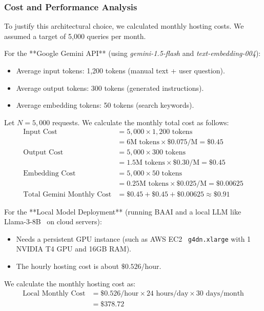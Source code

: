 \documentclass[12pt,a4paper]{report}
\begin{document}
\subsubsection{Cost and Performance Analysis}

To justify this architectural choice, we calculated monthly hosting costs. We assumed a target of 5,000 queries per month.

For the **Google Gemini API** (using \textit{gemini-1.5-flash} and \textit{text-embedding-004}):
\begin{itemize}
    \item Average input tokens: 1,200 tokens (manual text + user question).
    \item Average output tokens: 300 tokens (generated instructions).
    \item Average embedding tokens: 50 tokens (search keywords).
\end{itemize}
Let $N = 5,000$ requests. We calculate the monthly total cost as follows:
\begin{align}
\text{Input Cost} &= 5,000 \times 1,200 \text{ tokens} \nonumber \\
&= 6\text{M tokens} \times \$0.075/\text{M} = \$0.45 \\
\text{Output Cost} &= 5,000 \times 300 \text{ tokens} \nonumber \\
&= 1.5\text{M tokens} \times \$0.30/\text{M} = \$0.45 \\
\text{Embedding Cost} &= 5,000 \times 50 \text{ tokens} \nonumber \\
&= 0.25\text{M tokens} \times \$0.025/\text{M} = \$0.00625 \\
\text{Total Gemini Monthly Cost} &= \$0.45 + \$0.45 + \$0.00625 \approx \$0.91
\end{align}

For the **Local Model Deployment** (running BAAI and a local LLM like Llama-3-8B~\cite{llama3} on cloud servers):
\begin{itemize}
    \item Needs a persistent GPU instance (such as AWS EC2~\cite{aws_ec2} \texttt{g4dn.xlarge} with 1 NVIDIA T4 GPU and 16GB RAM).
    \item The hourly hosting cost is about $\$0.526$/hour.
\end{itemize}
We calculate the monthly hosting cost as:
\begin{align}
\text{Local Monthly Cost} &= \$0.526/\text{hour} \times 24\text{ hours/day} \times 30\text{ days/month} \nonumber \\
&= \$378.72
\end{align}
\end{document}
